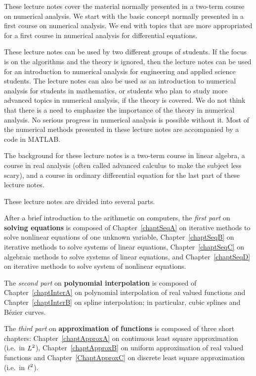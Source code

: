 
These lecture notes cover the material normally presented in a
two-term course on numerical analysis.  We start with the basic
concept normally presented in a first course on numerical analysis.
We end with topics that are more appropriated for a first course in
numerical analysis for differential equations.

These lecture notes can be used by two different groups of students.  If the
focus is on the algorithms and the theory is ignored, then the lecture
notes can be used for an introduction to numerical analysis for engineering
and applied science students.  The lecture notes can also be used as an
introduction to numerical analysis for students in mathematics, or
students who plan to study more advanced topics in numerical analysis, if
the theory is covered.  We do not think that there is a need to
emphasize the importance of the theory in numerical analysis.  No
serious progress in numerical analysis is possible without it.
Most of the numerical methods presented in these lecture notes are
accompanied by a code in MATLAB.

The background for these lecture notes is a two-term course in linear algebra,
a course in real analysis (often called advanced calculus to make
the subject less scary), and a course in ordinary differential
equation for the last part of these lecture notes.

These lecture notes are divided into several parts.

After a brief introduction to the arithmetic on computers, the
{\em first part} on {\bfseries solving equations} is composed of
Chapter~\ref{chaptSeqA} on iterative methods to solve nonlinear
equations of one unknown variable, Chapter~\ref{chaptSeqB} on
iterative methods to solve systems of linear equations,
Chapter~\ref{chaptSeqC} on algebraic methods to solve systems of
linear equations, and Chapter~\ref{chaptSeqD} on iterative methods to
solve system of nonlinear equations.

The {\em second part} on {\bfseries polynomial interpolation}
is composed of Chapter~\ref{chaptInterA} on polynomial interpolation of
real valued functions and Chapter~\ref{chaptInterB} on spline
interpolation; in particular, cubic splines and Bézier curves.

The {\em third part} on {\bfseries approximation of functions} is
composed of three short chapters: Chapter~\ref{chaptApproxA} on
continuous least square approximation (i.e.\ in $\displaystyle L^2$), 
Chapter~\ref{chaptApproxB} on uniform approximation of real
valued functions and Chapter~\ref{ChaptApproxC} on discrete least square
approximation (i.e.\ in $\displaystyle \ell^2$).

